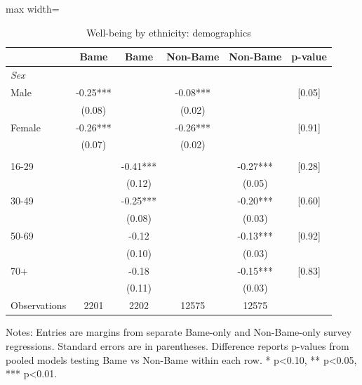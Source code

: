 \begin{table}[htbp]
\centering
\caption{Well-being by ethnicity: demographics}
\small
\begin{adjustbox}{max width=\textwidth}
\begin{tabular}{p{4.8cm}ccccc}
\toprule
& Bame & Bame & Non-Bame & Non-Bame & p-value \\
\midrule
\multicolumn{6}{l}{\textit{Sex}} \\
Male & -0.25*** &  & -0.08*** &  & [0.05] \\
& (0.08) &  & (0.02) &  & \\
Female & -0.26*** &  & -0.26*** &  & [0.91] \\
& (0.07) &  & (0.02) &  & \\
\addlinespace
\multicolumn{6}{l}{\textit{Age group}} \\
16-29 &  & -0.41*** &  & -0.27*** & [0.28] \\
&  & (0.12) &  & (0.05) & \\
30-49 &  & -0.25*** &  & -0.20*** & [0.60] \\
&  & (0.08) &  & (0.03) & \\
50-69 &  & -0.12 &  & -0.13*** & [0.92] \\
&  & (0.10) &  & (0.03) & \\
70+ &  & -0.18 &  & -0.15*** & [0.83] \\
&  & (0.11) &  & (0.03) & \\
\midrule
Observations & 2201 & 2202 & 12575 & 12575 & \\
\bottomrule
\end{tabular}
\end{adjustbox}

\begin{flushleft}
\footnotesize Notes: Entries are margins from separate Bame-only and Non-Bame-only survey regressions. Standard errors are in parentheses. Difference reports p-values from pooled models testing Bame vs Non-Bame within each row. * p<0.10, ** p<0.05, *** p<0.01.
\end{flushleft}
\end{table}